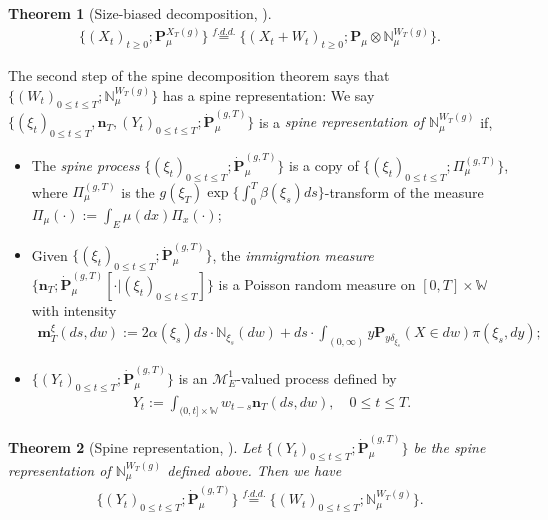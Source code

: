 \documentclass[UTF8]{pkuthss}
\theoremstyle{plain}
\newtheorem{thm}{Theorem}[section]
\theoremstyle{definition}
\numberwithin{equation}{section}
\begin{document}
\begin{thm}[Size-biased decomposition,  \cite{RenSongSun2017Spine}]\label{thm: size-biased decomposition}
\begin{align}
	\{(X_t)_{t\geq 0}; \mathbf P_\mu^{X_T(g)}\}
	\overset{f.d.d.}{=} \{(X_t+W_t)_{t\geq 0}; \mathbf P_\mu  \otimes \mathbb N^{W_T(g)}_\mu\}.
\end{align}
\end{thm}
	The second step of the spine decomposition theorem
	says that $\{(W_t)_{0\leq t\leq T}; \mathbb N^{W_T(g)}_\mu\}$ has a spine representation:
	We say $\{(\xi_t)_{0\leq t\leq T}, \mathbf n_T,  (Y_t)_{ 0\leq t\leq T}; \dot {\mathbf P}^{(g,T)}_\mu\}$ is a \emph{spine representation of $\mathbb N^{W_T(g)}_\mu$}  if,
\begin{itemize}
\item
	The \emph{spine process} $\{(\xi_t)_{0\leq t\leq T}; \dot{\mathbf P}^{(g,T)}_\mu\}$ is a copy of $\{(\xi_t)_{0\leq t\leq T}; \Pi^{(g,T)}_{\mu}\}$, 
	where $\Pi^{(g,T)}_{\mu}$ is the $g(\xi_T) \exp\{\int_0^T \beta(\xi_s)ds\}$-transform
	of the measure $\Pi_{\mu}(\cdot):=\int_{E}\mu(dx)\Pi_x(\cdot) $;
\item
	Given $\{(\xi_t)_{0\leq t\leq T}; \dot{\mathbf P}^{(g,T)}_\mu\}$, the \emph{immigration measure} $\{\mathbf n_T; \dot{\mathbf P}^{(g,T)}_\mu[\cdot |(\xi_t)_{0\leq t\leq T}]\}$ is a Poisson random measure on $[0,T] \times \mathbb W$ with intensity
\begin{align}
	\mathbf m^\xi_T(ds,dw)
	:= 2 \alpha(\xi_s) ds \cdot \mathbb N_{\xi_s}(dw) + ds \cdot \int_{(0,\infty)} y \mathbf P_{y\delta_{\xi_s}}(X\in dw) \pi(\xi_s,dy);
\end{align}
\item
	$\{(Y_t)_{0\leq t\leq T}; \dot{\mathbf P}^{(g,T)}_\mu\}$ is an $\mathcal M^1_E$-valued process defined by
\begin{align}
	Y_t
	:= \int_{(0,t] \times \mathbb W} w_{t-s} \mathbf n_T(ds,dw),
	\quad 0 \leq t\leq T.
\end{align}
\end{itemize}

\begin{thm}[Spine representation, \cite{RenSongSun2017Spine}]\label{thm: spine representation}
	Let $\{(Y_t)_{0\leq t\leq T}; \dot {\mathbf P}^{(g,T)}_\mu\}$ be the spine representation of $\mathbb N^{W_T(g)}_\mu$ defined above.
	Then we have
\begin{align}
	\{(Y_t)_{0\leq t\leq T}; \dot{\mathbf P}^{(g,T)}_\mu\}
	\overset{f.d.d.}{=} \{(W_t)_{0\leq t\leq T}; \mathbb N_\mu^{W_T(g)}\}.
\end{align}
\end{thm}
\end{document}
